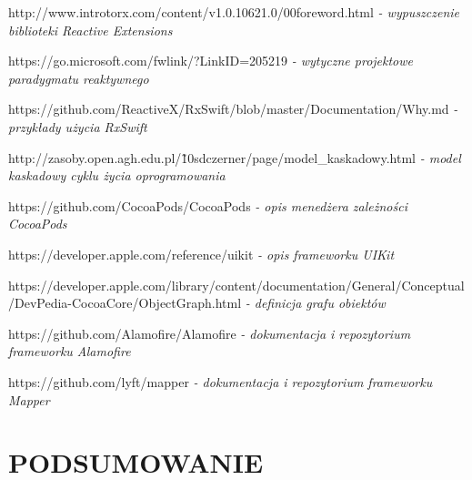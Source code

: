 \documentclass[12pt,oneside,a4paper]{report}
\begin{document}
\begin{thebibliography}{50}
 http://www.introtorx.com/content/v1.0.10621.0/00foreword.html
\emph{ - wypuszczenie biblioteki Reactive Extensions}

 https://go.microsoft.com/fwlink/?LinkID=205219
\emph{ - wytyczne projektowe paradygmatu reaktywnego}

https://github.com/ReactiveX/RxSwift/blob/master/Documentation/Why.md
\emph{ - przykłady użycia RxSwift}

 http://zasoby.open.agh.edu.pl/\~10sdczerner/page/model\_kaskadowy.html
\emph{ - model kaskadowy cyklu życia oprogramowania}

 https://github.com/CocoaPods/CocoaPods
\emph{ - opis menedżera zależności CocoaPods}

https://developer.apple.com/reference/uikit
\emph{ - opis frameworku UIKit}

 https://developer.apple.com/library/content/documentation/General/Conceptual/DevPedia-CocoaCore/ObjectGraph.html
\emph{ - definicja grafu obiektów}

https://github.com/Alamofire/Alamofire
\emph{ - dokumentacja i repozytorium frameworku Alamofire}

https://github.com/lyft/mapper
\emph{ - dokumentacja i repozytorium frameworku Mapper}
\end{thebibliography}
\chapter{PODSUMOWANIE}
\end{document}
